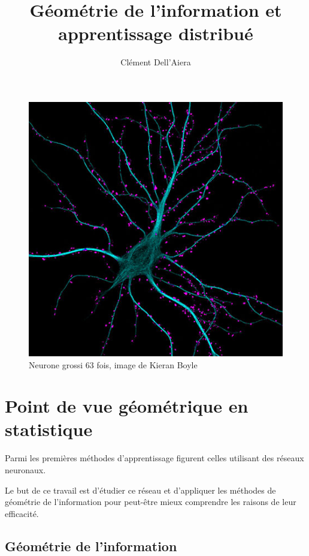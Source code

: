 \documentclass{article}
\title{Géométrie de l'information et apprentissage distribué}
\author{Clément Dell'Aiera}
\date{}
\begin{document}
\maketitle

\begin{figure}[h]\centering
\includegraphics[scale=0.6]{Neurone.jpg}
\caption{Neurone grossi 63 fois, image de Kieran Boyle}
\label{fig:Neurone}
\end{figure}

\newpage
\tableofcontents

\newpage
\section{Point de vue géométrique en statistique}

Parmi les premières méthodes d'apprentissage figurent celles utilisant des réseaux neuronaux. %

Le but de ce travail est d'étudier ce réseau et d'appliquer les méthodes de géométrie de l'information pour peut-être mieux comprendre les raisons de leur efficacité.%

\subsection{Géométrie de l'information}
\end{document}
